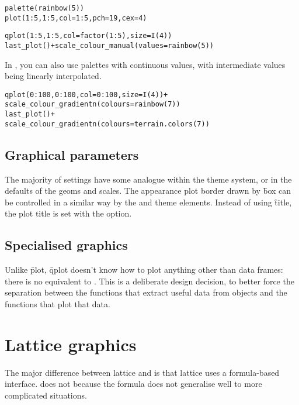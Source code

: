 \begin{alltt}
palette(rainbow(5))
plot(1:5, 1:5, col = 1:5, pch = 19, cex = 4)

qplot(1:5, 1:5, col = factor(1:5), size = I(4))
last_plot() + scale_colour_manual(values = rainbow(5))
\end{alltt}

In \ggplot, you can also use palettes with continuous values, with intermediate values being linearly interpolated.

\begin{alltt}
qplot(0:100, 0:100, col = 0:100, size = I(4)) +
  scale_colour_gradientn(colours = rainbow(7))
last_plot() +
  scale_colour_gradientn(colours = terrain.colors(7))
\end{alltt}

\subsection{Graphical parameters}

The majority of  settings have some analogue within the theme system, or in the defaults of the geoms and scales.  The appearance plot border drawn by \f{box} can be controlled in a similar way by the  and  theme elements.  Instead of using \f{title}, the plot title is set with the  option.

\subsection{Specialised graphics} 

Unlike \f{plot}, \f{qplot} doesn't know how to plot anything other than data frames: there is no equivalent to .  This is a deliberate design decision, to better force the separation between the functions that extract useful data from objects and the functions that plot that data.

% 
% 

\section{Lattice graphics}
\label{sec:translate-lattice}

The major difference between lattice and \ggplot is that lattice uses a formula-based interface.  \ggplot does not because the formula does not generalise well to more complicated situations.

